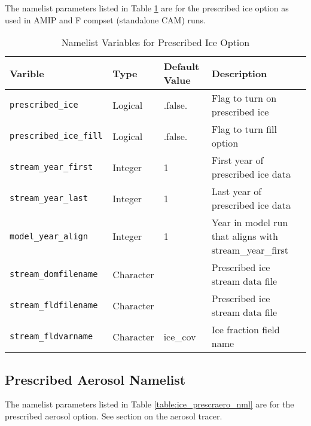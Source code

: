 The namelist parameters listed in Table \ref{table:ice_prescribed_nml} are for
the prescribed ice option as used in AMIP and F compset (standalone CAM) runs.

\begin{table}
  \begin{center}
  \caption{Namelist Variables for Prescribed Ice Option}
  \label{table:ice_prescribed_nml}
  \begin{tabular}{p{4.0cm}p{2.0cm}p{3cm}p{6.0cm}} \hline
  Varible & Type & Default Value & Description               \\
\hline \hline

{\tt prescribed\_ice} & Logical & .false. &  Flag to turn on prescribed ice \\

{\tt prescribed\_ice\_fill } & Logical & .false. &  Flag to turn fill option \\

{\tt stream\_year\_first } & Integer & 1 & First year of prescribed ice data \\

{\tt stream\_year\_last } & Integer & 1 & Last year of prescribed ice data \\

{\tt model\_year\_align } & Integer & 1 & Year in model run that aligns with stream\_year\_first \\

{\tt stream\_domfilename } & Character & & Prescribed ice stream data file \\

{\tt stream\_fldfilename } & Character & & Prescribed ice stream data file \\

{\tt stream\_fldvarname } & Character &  ice\_cov &  Ice fraction field name \\

  \hline
  \end{tabular}
  \end{center}
\end{table}

\subsection{Prescribed Aerosol Namelist}

The namelist parameters listed in Table \ref{table:ice_prescraero_nml} are for
the prescribed aerosol option. See section on the aerosol tracer.

